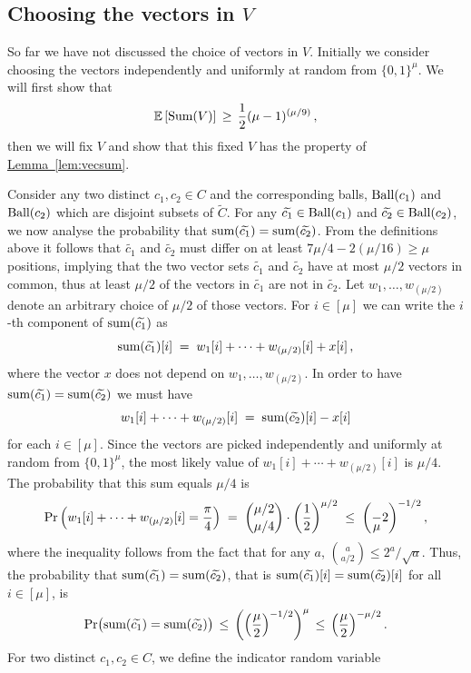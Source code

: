 \documentclass[11pt]{article}
\numberwithin{equation}{section}
\theoremstyle{definition}
\theoremstyle{plain}
\newcommand{\expref}[2]{\hyperref[#2]{#1~\ref{#2}}}
\newcommand{\Prob}{\ensuremath{\textup{Pr}}}
\newcommand{\ball}[1]{\ensuremath{\textup{Ball}(#1)}}
\newcommand{\Vsum}{\ensuremath{\textup{Sum}}}
\newcommand{\vsum}{\ensuremath{\textup{sum}}}
\newcommand{\Cbig}{\ensuremath{\widetilde{C}}}
\newcommand{\cbigI}{\ensuremath{\widetilde{c_1}}}
\newcommand{\cbigII}{\ensuremath{\widetilde{c_2}}}
\newcommand{\ELL}{\ensuremath{\mu}}
\newcommand{\expect}[1]{\mathbb{E}\left[{#1}\right]}
\begin{document}
\subsection{Choosing the vectors in \texorpdfstring{$V$}{V}}

So far we have not discussed the choice of vectors in $V$. 
Initially we consider choosing the vectors  independently and uniformly at random from $\{0,1\}^\ELL$.
We will first show that
\[
\expect{\Vsum(V)}\,\geq\, \frac12 (\ELL-1)^{(\ELL/9)}\,,
\]
then we will fix $V$ and show that this fixed $V$ has the property of \expref{Lemma}{lem:vecsum}.

Consider any two distinct  $c_1,c_2\in C$  and the corresponding balls, $\ball{c_1}$ and $\ball{c_2}$  which are disjoint subsets of $\Cbig$. For any $\cbigI\in\ball{c_1}$ and $\cbigII\in\ball{c_2}$, we now analyse the probability that
$\vsum(\cbigI)=\vsum(\cbigII)$. {}From the definitions above it follows that $\cbigI$ and $\cbigII$ must differ
on at least $7\ELL/4-2(\ELL/16)\geq \ELL$ positions, implying that the two vector sets $\cbigI$ and
$\cbigII$ have at most $\ELL/2$ vectors in common, thus at least $\ELL/2$ of the vectors in $\cbigI$ are not in $\cbigII$.
Let $w_1,\dots,w_{(\ELL/2)}$ denote an arbitrary choice of $\mu/2$ of those vectors.
For $i\in[\mu]$ we can write the $i$-th component of $\vsum(\cbigI)$ as
\[
\vsum(\cbigI)[i] \;=\; w_1[i]+\cdots +w_{(\ELL/2)}[i] + x[i]\,,
\]
where the vector $x$ does not depend on $w_1,\dots,w_{(\ELL/2)}$.
In order to have $\vsum(\cbigI)=\vsum(\cbigII)$ we must have
\[
w_1[i]+\cdots +w_{(\ELL/2)}[i] \;=\; \vsum(\cbigII)[i] - x[i]
\]
for each $i\in [\ELL]$.
Since the vectors are picked independently and uniformly at random from $\{0,1\}^\mu$,
the most likely value of $w_1[i]+\cdots +w_{(\ELL/2)}[i]$ is $\ELL/4$.
The probability that this sum equals $\mu/4$ is
\[
\Prob\left(w_1[i]+\cdots +w_{(\ELL/2)}[i] = \frac\pi 4\right)
\;=\;
\binom{\ELL/2}{\ELL/4 }\cdot \left(\frac12\right)^{\ELL/2}
\;\leq\;
\left(\frac \ELL 2\right)^{-1/2},
\]
where the inequality follows from the fact that for any $a$, $\binom a {a/2}\leq 2^a/\sqrt{a}$.
Thus, the probability that $\vsum(\cbigI)=\vsum(\cbigII)$, that is
$\vsum(\cbigI)[i]=\vsum(\cbigII)[i]$ for all $i\in [\mu]$, is
%
\begin{equation}
\label{eq:sum-equal}
\Prob\big(\vsum(\cbigI)=\vsum(\cbigII)\big)
\, \leq \,
\left(\left(\frac{\ELL}{2}\right)^{-1/2}\right)^\mu
\, \leq \,
\left(\frac{\ELL}{2}\right)^{-\ELL/2}.
\end{equation}
%
For two distinct $c_1,c_2\in C$, we define the indicator random variable
\end{document}
